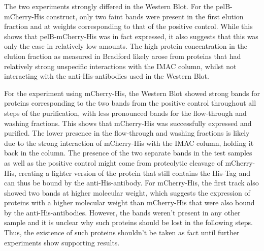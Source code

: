 \documentclass[a4paper,12pt]{article}
\begin{document}
The two experiments strongly differed in the Western Blot. For the pelB-mCherry-His construct, only two faint bands were present in the first elution fraction and at weights corresponding to that of the positive control. While this shows that pelB-mCherry-His was in fact expressed, it also suggests that this was only the case in relatively low amounts. The high protein concentration in the elution fraction as measured in Bradford likely arose from proteins that had relatively strong unspecific interactions with the IMAC column, whilst not interacting with the anti-His-antibodies used in the Western Blot. 

For the experiment using mCherry-His, the Western Blot showed strong bands for proteins corresponding to the two bands from the positive control throughout all steps of the purification, with less pronounced bands for the flow-through and washing fractions. This shows that mCherry-His was successfully expressed and purified. The lower presence in the flow-through and washing fractions is likely due to the strong interaction of mCherry-His with the IMAC column, holding it back in the column. The presence of the two separate bands in the test samples as well as the positive control might come from proteolytic cleavage of mCherry-His, creating a lighter version of the protein that still contains the His-Tag and can thus be bound by the anti-His-antibody. For mCherry-His, the first track also showed two bands at higher molecular weight, which suggests the expression of proteins with a higher molecular weight than mCherry-His that were also bound by the anti-His-antibodies. However, the bands weren't present in any other sample and it is unclear why such proteins should be lost in the following steps. Thus, the existence of such proteins shouldn't be taken as fact until further experiments show supporting results.
\end{document}
